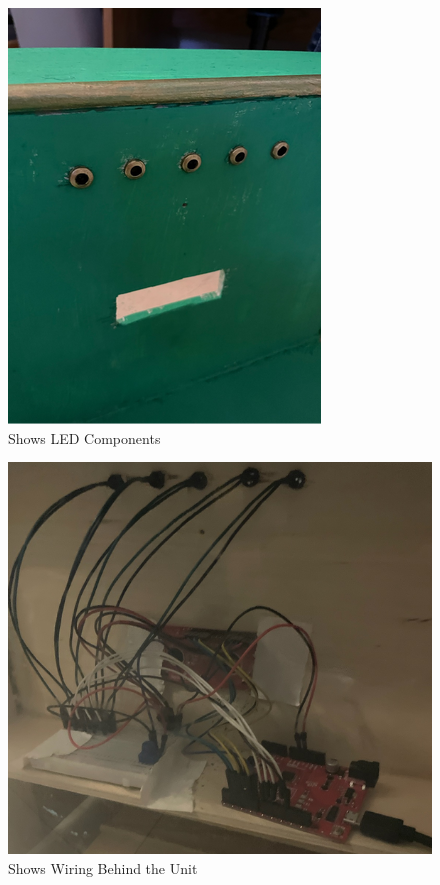 \documentclass[conference]{IEEEtran}
\begin{document}
 \begin{figure}[H]
   \centering
   \includegraphics[width=.9\textwidth]{Figures/Log/PhotoLog7.png}
   \caption{Shows LED Components}
 \end{figure}
 \begin{figure}[H]
   \centering
   \includegraphics[width=.75\textwidth]{Figures/Log/PhotoLog8.png}
   \caption{Shows Wiring Behind the Unit}
 \end{figure}
\end{document}
